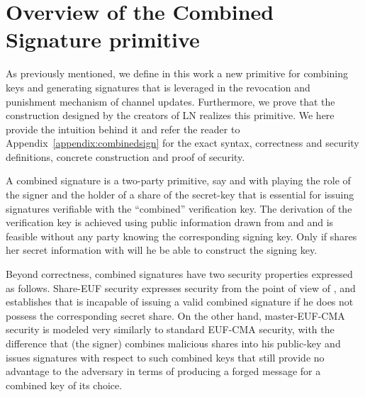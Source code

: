 \section{Overview of the Combined Signature primitive}
\label{sec:ov-combined-ds}
  As previously mentioned, we define in this work a new primitive for combining
  keys and generating signatures that is leveraged in the revocation and
  punishment mechanism of channel updates. Furthermore, we prove that the
  construction designed by the creators of LN realizes this primitive. We here
  provide the intuition behind it and refer the reader to
  Appendix~\ref{appendix:combinedsign} for the exact syntax, correctness and
  security definitions, concrete construction and proof of security.

  A combined signature is a two-party primitive, say \alice{} and \bob{} with
  \bob{} playing the role of the signer and \alice{} the holder of a share of
  the secret-key that is essential for issuing signatures verifiable with the
  ``combined'' verification key. The  derivation of the verification key is
  achieved  using public information drawn from  \alice{} and \bob and is
  feasible without any party knowing the corresponding signing key. Only if
  \alice{} shares her secret information with \bob{} will he be able to
  construct the signing key.

  Beyond correctness, combined signatures have two security properties expressed
  as follows. Share-EUF security expresses security from the point of view of
  \alice{}, and establishes that \bob{} is incapable of issuing a valid combined
  signature if he does not possess the corresponding secret share. On the other
  hand, master-EUF-CMA security is modeled very similarly to standard EUF-CMA
  security, with the difference that \bob{} (the signer) combines malicious
  shares into his public-key and issues signatures with respect to such combined
  keys that still provide no advantage to the adversary in terms of producing a
  forged message for a combined key of its choice.

